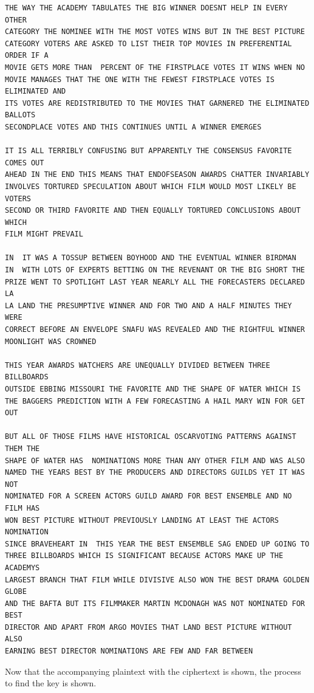 \documentclass[12pt]{article}
\begin{document}
\begin{verbatim}
THE WAY THE ACADEMY TABULATES THE BIG WINNER DOESNT HELP IN EVERY OTHER
CATEGORY THE NOMINEE WITH THE MOST VOTES WINS BUT IN THE BEST PICTURE
CATEGORY VOTERS ARE ASKED TO LIST THEIR TOP MOVIES IN PREFERENTIAL ORDER IF A
MOVIE GETS MORE THAN  PERCENT OF THE FIRSTPLACE VOTES IT WINS WHEN NO
MOVIE MANAGES THAT THE ONE WITH THE FEWEST FIRSTPLACE VOTES IS ELIMINATED AND
ITS VOTES ARE REDISTRIBUTED TO THE MOVIES THAT GARNERED THE ELIMINATED BALLOTS
SECONDPLACE VOTES AND THIS CONTINUES UNTIL A WINNER EMERGES

IT IS ALL TERRIBLY CONFUSING BUT APPARENTLY THE CONSENSUS FAVORITE COMES OUT
AHEAD IN THE END THIS MEANS THAT ENDOFSEASON AWARDS CHATTER INVARIABLY
INVOLVES TORTURED SPECULATION ABOUT WHICH FILM WOULD MOST LIKELY BE VOTERS
SECOND OR THIRD FAVORITE AND THEN EQUALLY TORTURED CONCLUSIONS ABOUT WHICH
FILM MIGHT PREVAIL

IN  IT WAS A TOSSUP BETWEEN BOYHOOD AND THE EVENTUAL WINNER BIRDMAN
IN  WITH LOTS OF EXPERTS BETTING ON THE REVENANT OR THE BIG SHORT THE
PRIZE WENT TO SPOTLIGHT LAST YEAR NEARLY ALL THE FORECASTERS DECLARED LA
LA LAND THE PRESUMPTIVE WINNER AND FOR TWO AND A HALF MINUTES THEY WERE
CORRECT BEFORE AN ENVELOPE SNAFU WAS REVEALED AND THE RIGHTFUL WINNER
MOONLIGHT WAS CROWNED

THIS YEAR AWARDS WATCHERS ARE UNEQUALLY DIVIDED BETWEEN THREE BILLBOARDS
OUTSIDE EBBING MISSOURI THE FAVORITE AND THE SHAPE OF WATER WHICH IS
THE BAGGERS PREDICTION WITH A FEW FORECASTING A HAIL MARY WIN FOR GET OUT

BUT ALL OF THOSE FILMS HAVE HISTORICAL OSCARVOTING PATTERNS AGAINST THEM THE
SHAPE OF WATER HAS  NOMINATIONS MORE THAN ANY OTHER FILM AND WAS ALSO
NAMED THE YEARS BEST BY THE PRODUCERS AND DIRECTORS GUILDS YET IT WAS NOT
NOMINATED FOR A SCREEN ACTORS GUILD AWARD FOR BEST ENSEMBLE AND NO FILM HAS
WON BEST PICTURE WITHOUT PREVIOUSLY LANDING AT LEAST THE ACTORS NOMINATION
SINCE BRAVEHEART IN  THIS YEAR THE BEST ENSEMBLE SAG ENDED UP GOING TO
THREE BILLBOARDS WHICH IS SIGNIFICANT BECAUSE ACTORS MAKE UP THE ACADEMYS
LARGEST BRANCH THAT FILM WHILE DIVISIVE ALSO WON THE BEST DRAMA GOLDEN GLOBE
AND THE BAFTA BUT ITS FILMMAKER MARTIN MCDONAGH WAS NOT NOMINATED FOR BEST
DIRECTOR AND APART FROM ARGO MOVIES THAT LAND BEST PICTURE WITHOUT ALSO
EARNING BEST DIRECTOR NOMINATIONS ARE FEW AND FAR BETWEEN
\end{verbatim}

Now that the accompanying plaintext with the ciphertext is shown, the process to find the key is shown. 
\end{document}
